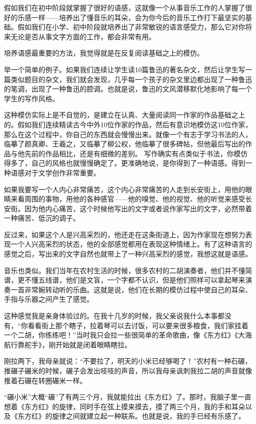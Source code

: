 \documentclass[12pt,a5paper]{ctexbook}
\begin{document}
假如我们在初中阶段就掌握了很好的语感，这就像一个从事音乐工作的人掌握了很好的乐感一样——培养出了懂音乐的耳朵，会为你今后的音乐工作打下最坚实的基础。假如我们在小学、初中阶段就培养出了非常敏锐的语言感受力，那么它对你将来无论是否从事文字方面的工作，都会非常有用。

培养语感最重要的方法，我觉得就是在反复阅读基础之上的模仿。

举一个简单的例子。如果我们连续让学生读10篇鲁迅的著名杂文，然后让学生写一篇类似题目的杂文，我们就会发现，几乎每一个孩子的杂文里边都出现了一种鲁迅的笔调，出现了一种鲁迅的腔调。也就是说，鲁迅的文风潜移默化地影响了每一个学生的写作风格。

这种模仿实际上是不自觉的，是建立在认真、大量阅读同一作家的作品基础之上的。假如我们连续精读古今中外10位作家的作品，然后有意识地模仿这10位作家，那么在这个过程中，你自己的东西就会慢慢出来。就像一个有志于学习书法的人，临摹了颜真卿、王羲之，又临摹了柳公权，他临摹了很多碑帖，但他最后写出的作品与他先前的作品相比，还是有细微的差别。
写作确实有点类似于书法，你模仿得多了，自己的风格也就慢慢确定了。更准确地说，是你得到了一种语感。得到一种语感对于文学创作非常重要。

如果我要写一个人内心非常痛苦，这个内心非常痛苦的人走到长安街上，用他的眼睛来看周围的事物，用他的各种感官——他的嗅觉、他的视觉、他的听觉来感受长安街。因为他内心痛苦，这个时候他写出的文字或者说作家写出的文字，必然带着一种痛苦、低沉的调子。

反过来，如果这个人是兴高采烈的，他还走在这条街道上，因为作家现在想努力表现一个人兴高采烈的状态，他的全部感觉都用在表现这种情绪上。有了这种语言的感觉之后，写出来的文字自然也就带上了一种兴高采烈的感觉，我想这就是语感。

音乐也类似。我们当年在农村生活的时候，很多农村的二胡演奏者，他们并不懂简谱，更不懂五线谱，他们是文盲，一个字都不认识，但是他们照样可以拿起琴来演奏一首非常婉转动听的乐曲。这就是说，他们在长期的模仿过程中使自己的耳朵、手指与乐器之间产生了感觉。

这种感觉我是亲身体验过的。在我十几岁的时候，我父亲说我什么本事都没有，“你看看街上那个瞎子，拉着琴可以去讨饭，可以要来很多粮食，我们家挂着一个二胡，你练练吧！”当时我只会拉一些很简单的革命歌曲，像《东方红》《大海航行靠舵手》，刚开始就是闭着眼睛瞎拉。

刚拉两下，我母亲就说：“不要拉了，明天的小米已经够喝了！”农村有一种石碾，推碾子碾米的时候，碾子会发出吱吱的声音，所以我母亲讽刺我拉二胡的声音就像推着石碾在转圈碾米一样。

“碾小米”大概“碾”了有两三个月，我就能拉出《东方红》了。那时，我脑子里一直想着《东方红》的旋律，同时手在弦上摸来摸去，摸了两三个月，我的手和耳朵以及《东方红》的旋律之间就建立起一种联系。也就是说，我的手已经有乐感了。
\end{document}
